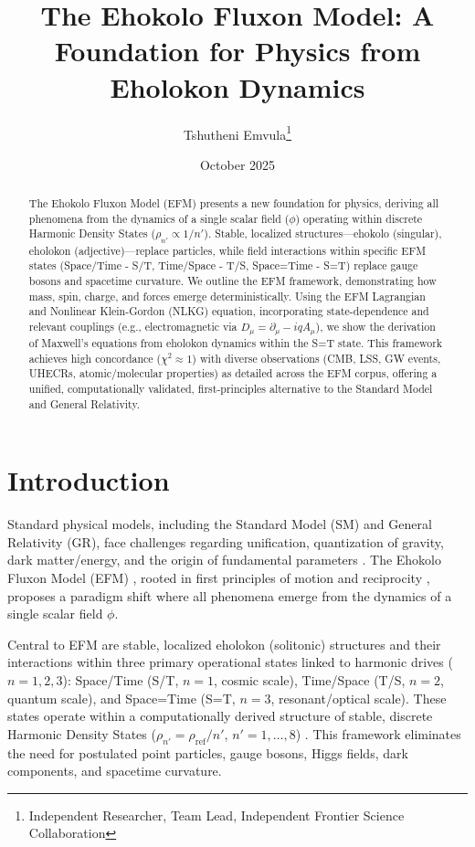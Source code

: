 \documentclass[11pt]{article}
\title{The Ehokolo Fluxon Model: A Foundation for Physics from Eholokon Dynamics}
\author{Tshutheni Emvula\thanks{Independent Researcher, Team Lead, Independent Frontier Science Collaboration}}
\date{October 2025}
\begin{document}
\maketitle

\begin{abstract}
The Ehokolo Fluxon Model (EFM) presents a new foundation for physics, deriving all phenomena from the dynamics of a single scalar field (\(\phi\)) operating within discrete Harmonic Density States (\(\rho_{n'} \propto 1 / n'\)). Stable, localized structures—ehokolo (singular), eholokon (adjective)—replace particles, while field interactions within specific EFM states (Space/Time - S/T, Time/Space - T/S, Space=Time - S=T) replace gauge bosons and spacetime curvature. We outline the EFM framework, demonstrating how mass, spin, charge, and forces emerge deterministically. Using the EFM Lagrangian and Nonlinear Klein-Gordon (NLKG) equation, incorporating state-dependence and relevant couplings (e.g., electromagnetic via \(D_\mu = \partial_\mu - i q A_\mu\)), we show the derivation of Maxwell’s equations from eholokon dynamics within the S=T state. This framework achieves high concordance (\(\chi^2 \approx 1\)) with diverse observations (CMB, LSS, GW events, UHECRs, atomic/molecular properties) as detailed across the EFM corpus, offering a unified, computationally validated, first-principles alternative to the Standard Model and General Relativity.
\end{abstract}

\section{Introduction}
Standard physical models, including the Standard Model (SM) and General Relativity (GR), face challenges regarding unification, quantization of gravity, dark matter/energy, and the origin of fundamental parameters \citep{sm_review2020}. The Ehokolo Fluxon Model (EFM) \citep{emvula2025compendium}, rooted in first principles of motion and reciprocity \citep{larson1959}, proposes a paradigm shift where all phenomena emerge from the dynamics of a single scalar field \(\phi\).

Central to EFM are stable, localized eholokon (solitonic) structures and their interactions within three primary operational states linked to harmonic drives (\(n=1,2,3\)): Space/Time (S/T, \(n=1\), cosmic scale), Time/Space (T/S, \(n=2\), quantum scale), and Space=Time (S=T, \(n=3\), resonant/optical scale). These states operate within a computationally derived structure of stable, discrete Harmonic Density States (\(\rho_{n'} = \rho_{\text{ref}}/n'\), \(n' = 1, \ldots, 8\)) \citep{emvula2025densities}. This framework eliminates the need for postulated point particles, gauge bosons, Higgs fields, dark components, and spacetime curvature.
\end{document}
